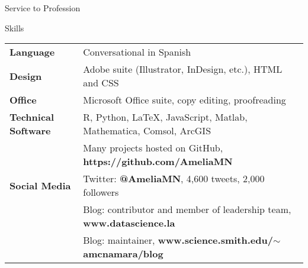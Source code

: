 \documentclass{resume} %
\begin{document}
\begin{rSection}{Service to Profession}
%
%
\end{rSection}

\clearpage


\begin{rSection}{Skills}

\begin{tabular}{ @{} >{\bfseries}l @{\hspace{6ex}} l }
Language & Conversational in Spanish \\
Design & Adobe suite (Illustrator, InDesign, etc.), %
HTML and CSS \\
Office & Microsoft Office suite, copy editing, proofreading %
 \\
Technical Software & R, Python, LaTeX, JavaScript, Matlab, Mathematica, Comsol, ArcGIS  \\
& Many projects hosted on GitHub, \textbf{https://github.com/AmeliaMN} \\
Social Media & Twitter: \textbf{@AmeliaMN}, 4,600 tweets, 2,000 followers \\
 & Blog: contributor and member of leadership team, \textbf{www.datascience.la} \\
 & Blog: maintainer, \textbf{www.science.smith.edu/$\sim$amcnamara/blog}
\end{tabular}
\end{rSection}
\end{document}
